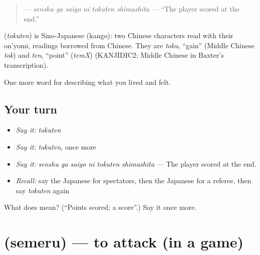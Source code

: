 \begin{quote}
\textbf{  } — \emph{senshu ga saigo ni tokuten shimashita} — \textquotedblleft{}The player scored at the end.\textquotedblright{}
\end{quote}

\begin{cousinweb}
\textbf{} (\emph{tokuten}) is Sino-Japanese (kango): two Chinese characters read with their on'yomi, readings borrowed from Chinese. They are \emph{toku}, \textquotedblleft{}gain\textquotedblright{} (Middle Chinese \emph{tok}) and \emph{ten}, \textquotedblleft{}point\textquotedblright{} (\emph{temX}) (KANJIDIC2; Middle Chinese in Baxter's transcription).
\end{cousinweb}

\begin{grammarlens}[title={What you've built}]
One more word for describing what you lived and felt.
\end{grammarlens}

\subsection*{Your turn}
\begin{itemize}
\raggedright
  \item \emph{Say it:} \emph{tokuten}
  \item \emph{Say it:} \emph{tokuten}, once more
  \item \emph{Say it:} \emph{senshu ga saigo ni tokuten shimashita} — The player scored at the end.
  \item \emph{Recall:} say the Japanese for spectators, then the Japanese for a referee, then say \emph{tokuten} again
\end{itemize}

\begin{tcolorbox}[breakable,colback=teal!4,colframe=teal!35!black,title={Before you move on}]
What does  mean? (\textquotedblleft{}Points scored; a score\textquotedblright{}.) Say it once more.
\end{tcolorbox}
\section[\texorpdfstring{\ja{せめる} (semeru)}{せめる (semeru)}]{ (semeru) — to attack (in a game)}

\label{lesson:JA-C464-semeru}



